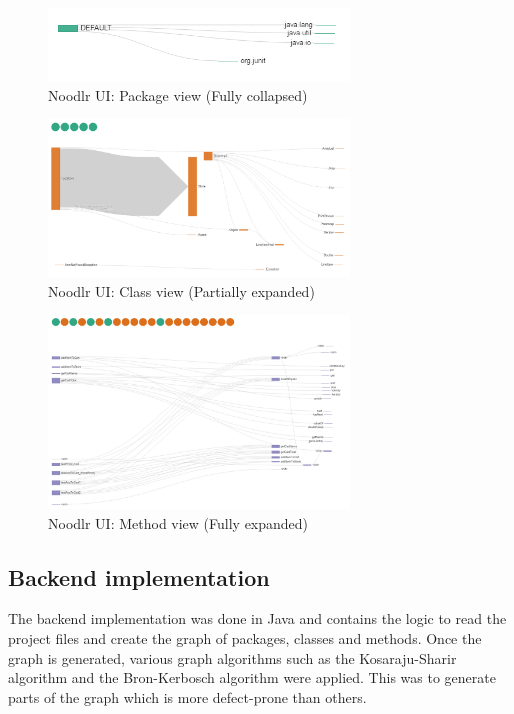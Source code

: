 \begin{figure}[h!]
\includegraphics[width=8cm]{ui-package-view}
\caption{Noodlr UI: Package view (Fully collapsed)}
\label{fig:noodlr_ui_package}
\end{figure}

\begin{figure}[h!]
\includegraphics[width=8cm]{ui-class-view}
\caption{Noodlr UI: Class view (Partially expanded)}
\label{fig:noodlr_ui_class}
\end{figure}

\begin{figure}[h!]
\includegraphics[width=8cm]{ui-method-view}
\caption{Noodlr UI: Method view (Fully expanded)}
\label{fig:noodlr_ui_method}
\end{figure}

\subsection{Backend implementation}

The backend implementation was done in Java and contains the logic to read the project files and create the graph of packages, classes and methods. Once the graph is generated, various graph algorithms such as the Kosaraju-Sharir algorithm and the Bron-Kerbosch algorithm were applied. This was to generate parts of the graph which is more defect-prone than others.\\

